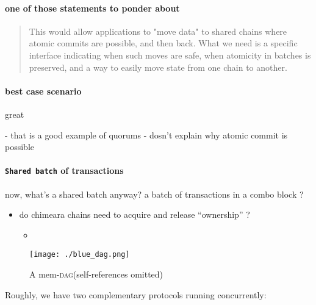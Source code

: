 \documentclass{article}
\theoremstyle{definition}
\newcommand{\Dag}[1][]{\textsc{dag}#1\xspace}
\begin{document}
\paragraph{one of those statements to ponder about}

\begin{quote}
  This would allow applications to "move data" to shared chains where atomic commits are possible, and then back. What we need is a specific interface indicating when such moves are safe, when atomicity in batches is preserved, and a way to easily move state from one chain to another.
\end{quote}


\paragraph{best case scenario}
great
\begin{markdown}
  - that is a good example of quorums
  - dosn't explain why atomic commit is possible
\end{markdown}
\paragraph{\texttt{Shared batch} of transactions}
now,
what's a shared batch anyway?
a batch of transactions in a combo block ?




\begin{itemize}
\item 
  do chimeara chains need to acquire and release “ownership” ?


  \begin{itemize}
  \item 
  \end{itemize}

\end{itemize}








\begin{figure}[htb]
  \centering
  \texttt{[image: ./blue\_dag.png]}
  \caption{A mem-\Dag (self-references omitted)}
  \label{fig:blue_dag}
\end{figure}



Roughly, we have two complementary protocols running concurrently: 
\end{document}
